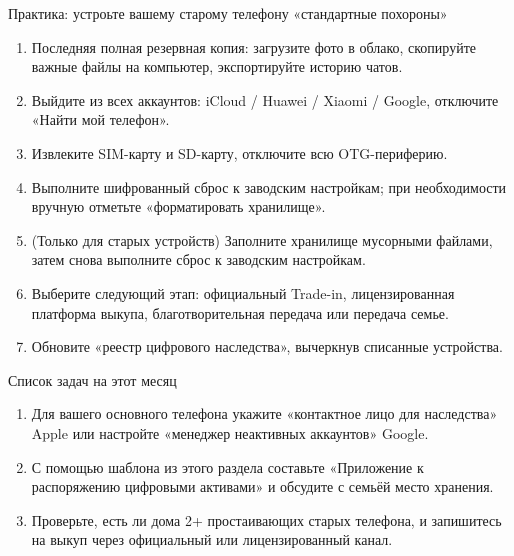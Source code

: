 \begin{tcbpractice}{Практика: устроьте вашему старому телефону «стандартные похороны»}
\begin{enumerate}
  \item Последняя полная резервная копия: загрузите фото в облако, скопируйте важные файлы на компьютер, экспортируйте историю чатов.
  \item Выйдите из всех аккаунтов: iCloud / Huawei / Xiaomi / Google, отключите «Найти мой телефон».
  \item Извлеките SIM-карту и SD-карту, отключите всю OTG-периферию.
  \item Выполните шифрованный сброс к заводским настройкам; при необходимости вручную отметьте «форматировать хранилище».
  \item (Только для старых устройств) Заполните хранилище мусорными файлами, затем снова выполните сброс к заводским настройкам.
  \item Выберите следующий этап: официальный Trade-in, лицензированная платформа выкупа, благотворительная передача или передача семье.
  \item Обновите «реестр цифрового наследства», вычеркнув списанные устройства.
\end{enumerate}

\end{tcbpractice}

\begin{tcbpractice}{Список задач на этот месяц}
\begin{enumerate}
  \item Для вашего основного телефона укажите «контактное лицо для наследства» Apple или настройте «менеджер неактивных аккаунтов» Google.
  \item С помощью шаблона из этого раздела составьте «Приложение к распоряжению цифровыми активами» и обсудите с семьёй место хранения.
  \item Проверьте, есть ли дома 2+ простаивающих старых телефона, и запишитесь на выкуп через официальный или лицензированный канал.
\end{enumerate}

\end{tcbpractice}
